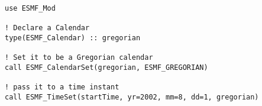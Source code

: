 
\begin{verbatim}
use ESMF_Mod

! Declare a Calendar
type(ESMF_Calendar) :: gregorian

! Set it to be a Gregorian calendar
call ESMF_CalendarSet(gregorian, ESMF_GREGORIAN)

! pass it to a time instant
call ESMF_TimeSet(startTime, yr=2002, mm=8, dd=1, gregorian)
\end{verbatim}
